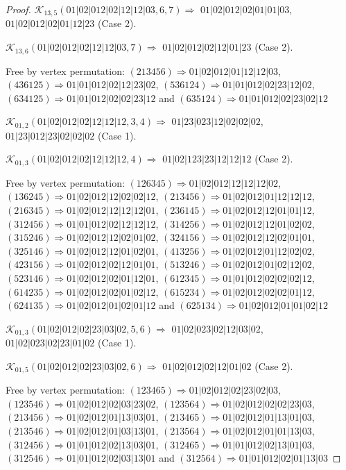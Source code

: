 \documentclass[12pt]{article}
\theoremstyle{plain}
\theoremstyle{definition}
\theoremstyle{remark}
\newcommand{\fancy}[1]{\mathcal{#1}}
\def\K{\fancy{K}}
\begin{document}
\begin{proof}
	$\K_{13,5}(01|02|012|02|12|12|03,6, 7)\Rightarrow $ $01|02|012|02|01|01|03$, $01|02|012|02|01|12|23$ (Case 2).
	
	$\K_{13,6}(01|02|012|02|12|12|03,7)\Rightarrow $ $01|02|012|02|12|01|23$ (Case 2).
	
	
	
	Free by vertex permutation: $(2 1 3 4 5 6)\Rightarrow 01|02|012|01|12|12|03$, $(4 3 6 1 2 5)\Rightarrow 01|01|012|02|12|23|02$, $(5 3 6 1 2 4)\Rightarrow 01|01|012|02|23|12|02$, $(6 3 4 1 2 5)\Rightarrow 01|01|012|02|02|23|12$ and $(6 3 5 1 2 4)\Rightarrow 01|01|012|02|23|02|12$
	
	
	
	\bigskip
	
	$\K_{01,2}(01|02|012|02|12|12|12,3, 4)\Rightarrow $ $01|23|023|12|02|02|02$, $01|23|012|23|02|02|02$ (Case 1).
	
	$\K_{01,3}(01|02|012|02|12|12|12,4)\Rightarrow $ $01|02|123|23|12|12|12$ (Case 2).
	
	
	
	Free by vertex permutation: $(1 2 6 3 4 5)\Rightarrow 01|02|012|12|12|12|02$, $(1 3 6 2 4 5)\Rightarrow 01|02|012|12|02|02|12$, $(2 1 3 4 5 6)\Rightarrow 01|02|012|01|12|12|12$, $(2 1 6 3 4 5)\Rightarrow 01|02|012|12|12|12|01$, $(2 3 6 1 4 5)\Rightarrow 01|02|012|12|01|01|12$, $(3 1 2 4 5 6)\Rightarrow 01|01|012|02|12|12|12$, $(3 1 4 2 5 6)\Rightarrow 01|02|012|12|01|02|02$, $(3 1 5 2 4 6)\Rightarrow 01|02|012|12|02|01|02$, $(3 2 4 1 5 6)\Rightarrow 01|02|012|12|02|01|01$, $(3 2 5 1 4 6)\Rightarrow 01|02|012|12|01|02|01$, $(4 1 3 2 5 6)\Rightarrow 01|02|012|01|12|02|02$, $(4 2 3 1 5 6)\Rightarrow 01|02|012|02|12|01|01$, $(5 1 3 2 4 6)\Rightarrow 01|02|012|01|02|12|02$, $(5 2 3 1 4 6)\Rightarrow 01|02|012|02|01|12|01$, $(6 1 2 3 4 5)\Rightarrow 01|01|012|02|02|02|12$, $(6 1 4 2 3 5)\Rightarrow 01|02|012|02|01|02|12$, $(6 1 5 2 3 4)\Rightarrow 01|02|012|02|02|01|12$, $(6 2 4 1 3 5)\Rightarrow 01|02|012|01|02|01|12$ and $(6 2 5 1 3 4)\Rightarrow 01|02|012|01|01|02|12$
	
	
	
	\bigskip
	
	$\K_{01,3}(01|02|012|02|23|03|02,5, 6)\Rightarrow $ $01|02|023|02|12|03|02$, $01|02|023|02|23|01|02$ (Case 1).
	
	$\K_{01,5}(01|02|012|02|23|03|02,6)\Rightarrow $ $01|02|012|02|12|01|02$ (Case 2).
	
	
	
	Free by vertex permutation: $(1 2 3 4 6 5)\Rightarrow 01|02|012|02|23|02|03$, $(1 2 3 5 4 6)\Rightarrow 01|02|012|02|03|23|02$, $(1 2 3 5 6 4)\Rightarrow 01|02|012|02|02|23|03$, $(2 1 3 4 5 6)\Rightarrow 01|02|012|01|13|03|01$, $(2 1 3 4 6 5)\Rightarrow 01|02|012|01|13|01|03$, $(2 1 3 5 4 6)\Rightarrow 01|02|012|01|03|13|01$, $(2 1 3 5 6 4)\Rightarrow 01|02|012|01|01|13|03$, $(3 1 2 4 5 6)\Rightarrow 01|01|012|02|13|03|01$, $(3 1 2 4 6 5)\Rightarrow 01|01|012|02|13|01|03$, $(3 1 2 5 4 6)\Rightarrow 01|01|012|02|03|13|01$ and $(3 1 2 5 6 4)\Rightarrow 01|01|012|02|01|13|03$
	

\end{proof}
\end{document}
